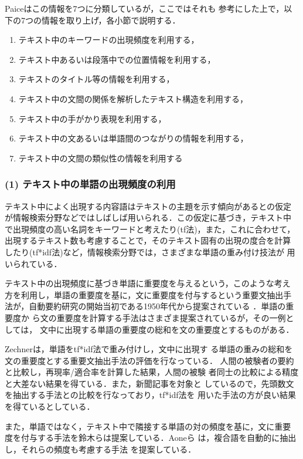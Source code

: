 Paice\cite{paice:90:a}はこの情報を7つに分類しているが，ここではそれも
参考にした上で，以下の7つの情報を取り上げ，各小節で説明する．
\begin{enumerate}
\item テキスト中のキーワードの出現頻度を利用する，
\item テキスト中あるいは段落中での位置情報を利用する，
\item テキストのタイトル等の情報を利用する，
\item テキスト中の文間の関係を解析したテキスト構造を利用する，
\item テキスト中の手がかり表現を利用する，
\item テキスト中の文あるいは単語間のつながりの情報を利用する，
\item テキスト中の文間の類似性の情報を利用する
\end{enumerate}

\subsubsection{(1) テキスト中の単語の出現頻度の利用}

テキスト中によく出現する内容語はテキストの主題を示す傾向があるとの仮定
が情報検索分野などではしばしば用いられる．この仮定に基づき，テキスト中
で出現頻度の高い名詞をキーワードと考えたり(tf法)，また，これに合わせて，
出現するテキスト数も考慮することで，そのテキスト固有の出現の度合を計算
したり(tf*idf法)など，情報検索分野では，さまざまな単語の重み付け技法が
用いられている\cite{salton:89:a}．

テキスト中の出現頻度に基づき単語に重要度を与えるという，このような考え
方を利用し，単語の重要度を基に，文に重要度を付与するという重要文抽出手
法が，自動要約研究の開始当初である1950年代から提案されている
\cite{luhn:58:a,edmundson:69:a,zechner:96:a,wakao:97:a}．単語の重要度か
ら文の重要度を計算する手法はさまざま提案されているが，その一例としては，
文中に出現する単語の重要度の総和を文の重要度とするものがある．

Zechner\cite{zechner:96:a}は，単語をtf*idf法で重み付けし，文中に出現す
る単語の重みの総和を文の重要度とする重要文抽出手法の評価を行なっている．
人間の被験者の要約と比較し，再現率/適合率を計算した結果，人間の被験
者同士の比較による精度と大差ない結果を得ている．また，新聞記事を対象と
しているので，先頭数文を抽出する手法との比較を行なっており，tf*idf法を
用いた手法の方が良い結果を得ているとしている．

また，単語ではなく，テキスト中で隣接する単語の対の頻度を基に，文に重要
度を付与する手法を鈴木らは提案している\cite{suzuki:88:a}．Aoneら
\cite{aone:97:a}は，複合語を自動的に抽出し，それらの頻度も考慮する手法
を提案している．

